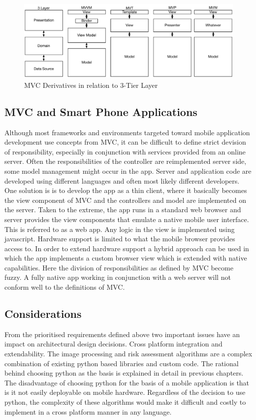 \begin{figure}[H]
    \centering
    \includegraphics[height=4cm,keepaspectratio]{assets/concept/mvc_3.pdf}
    \caption{MVC Derivatives in relation to 3-Tier Layer}
    \label{fig:mvc_alt}
\end{figure}

\subsection{MVC and Smart Phone Applications}

Although most frameworks and environments targeted toward mobile application development use concepts from MVC, it can be difficult to define strict devision of responsibility, especially in conjunction with services provided from an online server. Often the responsibilities of the controller are reimplemented server side, some model management might occur in the app. Server and application code are developed using different languages and often most likely different developers. One solution is is to develop the app as a thin client, where it basically becomes the view component of MVC and the controllers and model are implemented on the server. Taken to the extreme, the app runs in a standard web browser and server provides the view components that emulate a native mobile user interface. This is referred to as a web app. Any logic in the view is implemented using javascript. Hardware support is limited to what the mobile browser provides access to. In order to extend hardware support a hybrid approach can be used in which the app implements a custom browser view which is extended with native capabilities. Here the division of responsibilities as defined by MVC become fuzzy. A fully native app working in conjunction with a web server will not conform well to the definitions of MVC.

\subsection{Considerations}

From the prioritised requirements defined above two important issues have an impact on architectural design decisions. Cross platform integration and extendability. The image processing and risk assessment algorithms are a complex combination of existing python based libraries and custom code. The rational behind choosing python as the basis is explained in detail in previous chapters. The disadvantage of choosing python for the basis of a mobile application is that is it not easily deployable on mobile hardware. Regardless of the decision to use python, the complexity of these algorithms would make it difficult and costly to implement in a cross platform manner in any language.

